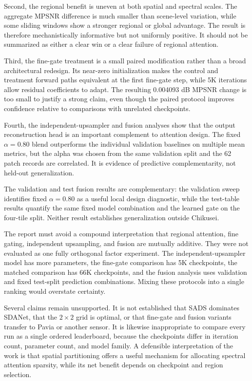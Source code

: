 \documentclass[10pt,twocolumn,letterpaper]{article}
\begin{document}
Second, the regional benefit is uneven at both spatial and spectral scales. The aggregate MPSNR difference is much smaller than scene-level variation, while some sliding windows show a stronger regional or global advantage. The result is therefore mechanistically informative but not uniformly positive. It should not be summarized as either a clear win or a clear failure of regional attention.

Third, the fine-gate treatment is a small paired modification rather than a broad architectural redesign. Its near-zero initialization makes the control and treatment forward paths equivalent at the first fine-gate step, while 5K iterations allow residual coefficients to adapt. The resulting 0.004093 dB MPSNR change is too small to justify a strong claim, even though the paired protocol improves confidence relative to comparisons with unrelated checkpoints.

Fourth, the independent-upsampler and fusion analyses show that the output reconstruction head is an important complement to attention design. The fixed $\alpha=0.80$ blend outperforms the individual validation baselines on multiple mean metrics, but the alpha was chosen from the same validation split and the 62 patch records are correlated. It is evidence of predictive complementarity, not held-out generalization.

The validation and test fusion results are complementary: the validation sweep identifies fixed $\alpha=0.80$ as a useful local design diagnostic, while the test-table results quantify the same fixed model combination and the learned gate on the four-tile split. Neither result establishes generalization outside Chikusei.

The report must avoid a compound interpretation that regional attention, fine gating, independent upsampling, and fusion are mutually additive. They were not evaluated as one fully orthogonal factor experiment. The independent-upsampler model has more parameters, the fine-gate comparison has 5K checkpoints, the matched comparison has 66K checkpoints, and the fusion analysis uses validation and fixed test-split prediction combinations. Mixing these protocols into a single ranking would overstate certainty.

\FloatBarrier
Several claims remain unsupported. It is not established that SADS dominates SDANet, that the $2\times2$ grid is optimal, or that fine-gate and fusion variants transfer to Pavia or another sensor. It is likewise inappropriate to compare every run as a single ordered leaderboard, because the checkpoints differ in iteration count, parameter count, and model family. A defensible interpretation of the work is that spatial partitioning offers a useful mechanism for allocating spectral attention sparsity, while its net benefit depends on checkpoint and region selection.
\end{document}
